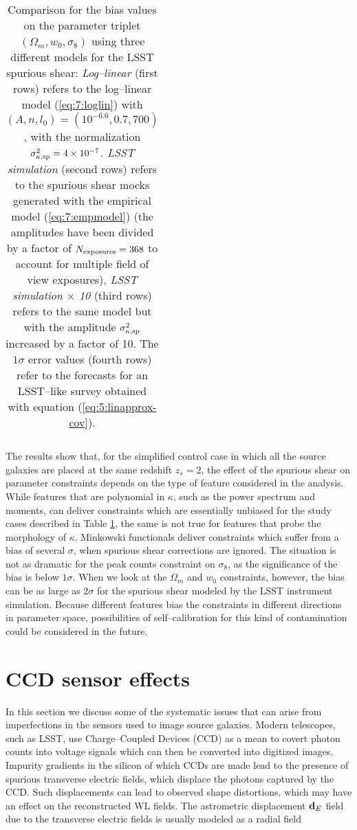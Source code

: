 \begin{table}
\begin{center}
\begin{tabular}{c|ccc}
\end{tabular}
\end{center}

\caption{Comparison for the bias values on the parameter triplet $(\Omega_m,w_0,\sigma_8)$ using three different models for the LSST spurious shear: \textit{Log--linear} (first rows) refers to the log--linear model (\ref{eq:7:loglin}) with $(A,n,l_0)=(10^{-6.6},0.7,700)$, with the normalization $\sigma^2_{\kappa,{\rm sp}}=4\times10^{-7}$. \textit{LSST simulation} (second rows) refers to the spurious shear mocks generated with the empirical model (\ref{eq:7:empmodel}) (the amplitudes have been divided by a factor of $N_{\rm exposures}=368$ to account for multiple field of view exposures), \textit{LSST simulation $\times$ 10} (third rows) refers to the same model but with the amplitude $\sigma^2_{\kappa,{\rm sp}}$ increased by a factor of 10. The $1\sigma$ error values (fourth rows) refer to the forecasts for an LSST--like survey obtained with equation (\ref{eq:5:linapprox-cov}).}
\label{tab:7:spbias}
\end{table}
%
The results show that, for the simplified control case in which all the source galaxies are placed at the same redshift $z_s=2$, the effect of the spurious shear on parameter constraints depends on the type of feature considered in the analysis. While features that are polynomial in $\kappa$, such as the power spectrum and moments, can deliver constraints which are essentially unbiased for the study cases described in Table \ref{tab:7:spbias}, the same is not true for features that probe the morphology of $\kappa$. Minkowski functionals deliver constraints which suffer from a bias of several $\sigma$, when spurious shear corrections are ignored. The situation is not as dramatic for the peak counts constraint on $\sigma_8$, as the significance of the bias is below $1\sigma$. When we look at the $\Omega_m$ and $w_0$ constraints, however, the bias can be as large as $2\sigma$ for the spurious shear modeled by the LSST instrument simulation. Because different features bias the constraints in different directions in parameter space, possibilities of self--calibration for this kind of contamination could be considered in the future.

\section{CCD sensor effects}
In this section we discuss some of the systematic issues that can arise from imperfections in the sensors used to image source galaxies. Modern telescopes, such as LSST, use Charge--Coupled Devices (CCD) \citep{CCDBook,LSST,LSSTOperations} as a mean to covert photon counts into voltage signals which can then be converted into digitized images. Impurity gradients in the silicon of which CCDs are made lead to the presence of spurious transverse electric fields, which displace the photons captured by the CCD. Such displacements can lead to observed shape distortions, which may have an effect on the reconstructed WL fields. The astrometric displacement $\mathbf{d}_E$ field due to the transverse electric fields is usually modeled as a radial field \citep{PetriCCD}

